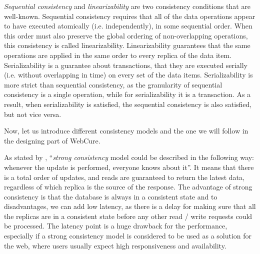 \textit{Sequential consistency} and \textit{linearizability} are two consistency conditions that are well-known. Sequential consistency requires that all of the data operations appear to have executed atomically (i.e. independently), in some sequential order. When this order must also preserve the global ordering of non-overlapping operations, this consistency is called linearizability\cite{27}. Linearizability guarantees that the same operations are applied in the same order to every replica of the data item\cite{12}. Serializability is a guarantee about transactions, that they are executed serially (i.e. without overlapping in time) on every set of the data items\cite{12}. Serializability is more strict than sequential consistency, as the granularity of sequential consistency is a single operation, while for serializability it is a transaction. As a result, when serializability is satisfied, the sequential consistency is also satisfied, but not vice versa.

Now, let us introduce different consistency models and the one we will follow in the designing part of WebCure. 

As stated by \citet{10}, ``\textit{strong consistency} model could be described in the following way: whenever the update is performed, everyone knows about it''. It means that there is a total order of updates, and reads are guaranteed to return the latest data, regardless of which replica is the source of the response. The advantage of strong consistency is that the database is always in a consistent state and to disadvantages, we can add low latency, as there is a delay for making sure that all the replicas are in a consistent state before any other read / write requests could be processed. The latency point is a huge drawback for the performance, especially if a strong consistency model is considered to be used as a solution for the web, where users usually expect high responsiveness and availability. 

